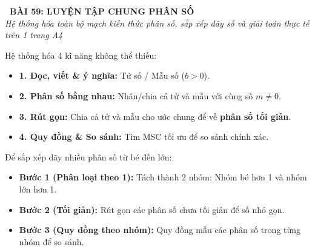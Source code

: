 \documentclass[14pt,a4paper,oneside]{extbook}
\begin{document}
\noindent
\begin{tcolorbox}[
  enhanced,
  colback=teal!8!white,
  colframe=teal!80!black,
  arc=3mm, boxrule=1pt,
  left=3mm, right=3mm, top=2mm, bottom=2mm,
  halign=center
]
  {\Large\bfseries\color{teal!90!black}\faBookmark\ BÀI 59: LUYỆN TẬP CHUNG PHÂN SỐ}\\[1.5pt]
  {\footnotesize\itshape\color{black!75} Hệ thống hóa toàn bộ mạch kiến thức phân số, sắp xếp dãy số và giải toán thực tế trên 1 trang A4}
\end{tcolorbox}

\vspace{-2.5mm}

\noindent
\begin{minipage}[t]{0.49\textwidth}\vspace{0pt}
\begin{tcolorbox}[
  enhanced,
  colback=blue!4!white,
  colframe=blue!75!black,
  arc=2mm, boxrule=0.8pt,
  left=2mm, right=2mm, top=1.8mm, bottom=1.8mm,
  title={\footnotesize\bfseries\color{white}\faCube\ 1. Bốn kĩ năng trụ cột phân số}
]
{\footnotesize
Hệ thống hóa 4 kĩ năng không thể thiếu:
\begin{itemize}\setlength{\itemsep}{1pt}\setlength{\leftskip}{-2.5mm}
  \item \textbf{1. Đọc, viết \& ý nghĩa:} Tử số / Mẫu số ($b > 0$).
  \item \textbf{2. Phân số bằng nhau:} Nhân/chia cả tử và mẫu với cùng số $m \ne 0$.
  \item \textbf{3. Rút gọn:} Chia cả tử và mẫu cho ước chung để về \textbf{phân số tối giản}.
  \item \textbf{4. Quy đồng \& So sánh:} Tìm MSC tối ưu để so sánh chính xác.
\end{itemize}
}
\end{tcolorbox}
\end{minipage}
\hfill
\begin{minipage}[t]{0.49\textwidth}\vspace{0pt}
\begin{tcolorbox}[
  enhanced,
  colback=teal!4!white,
  colframe=teal!75!black,
  arc=2mm, boxrule=0.8pt,
  left=2mm, right=2mm, top=1.8mm, bottom=1.8mm,
  title={\footnotesize\bfseries\color{white}\faSortAmountAsc\ 2. Chiến lược sắp xếp dãy phân số}
]
{\footnotesize
Để sắp xếp dãy nhiều phân số từ bé đến lớn:
\begin{itemize}\setlength{\itemsep}{1pt}\setlength{\leftskip}{-2.5mm}
  \item \textbf{Bước 1 (Phân loại theo 1):} Tách thành 2 nhóm: Nhóm bé hơn 1 và nhóm lớn hơn 1.
  \item \textbf{Bước 2 (Tối giản):} Rút gọn các phân số chưa tối giản để số nhỏ gọn.
  \item \textbf{Bước 3 (Quy đồng theo nhóm):} Quy đồng mẫu các phân số trong từng nhóm để so sánh.
\end{itemize}
}
\end{tcolorbox}
\end{minipage}
\end{document}
